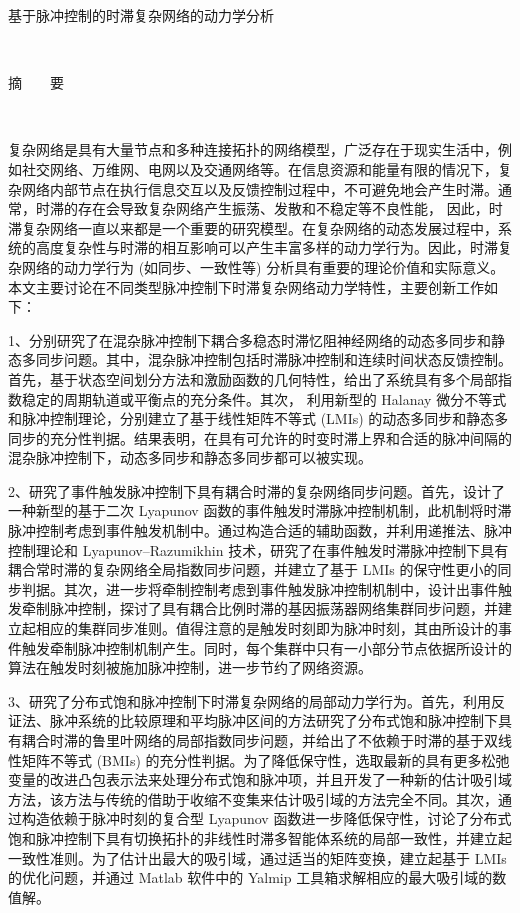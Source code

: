 \newpage
\setcounter{page}{1}

\pagestyle{plain}
\begin{center}
 {\heiti{} 基于脉冲控制的时滞复杂网络的动力学分析}
 \end{center}　

 \begin{center}
 {\heiti{}  摘~~~~要}
 \end{center}　

\renewcommand{\theequation}{\arabic{equation}}
\setcounter{equation}{0}

\vskip 4pt

复杂网络是具有大量节点和多种连接拓扑的网络模型，广泛存在于现实生活中，例如社交网络、万维网、电网以及交通网络等。在信息资源和能量有限的情况下，复杂网络内部节点在执行信息交互以及反馈控制过程中，不可避免地会产生时滞。通常，时滞的存在会导致复杂网络产生振荡、发散和不稳定等不良性能，
因此，时滞复杂网络一直以来都是一个重要的研究模型。在复杂网络的动态发展过程中，系统的高度复杂性与时滞的相互影响可以产生丰富多样的动力学行为。因此，时滞复杂网络的动力学行为 (如同步、一致性等) 分析具有重要的理论价值和实际意义。本文主要讨论在不同类型脉冲控制下时滞复杂网络动力学特性，主要创新工作如下：

\vskip 4pt
1、分别研究了在混杂脉冲控制下耦合多稳态时滞忆阻神经网络的动态多同步和静态多同步问题。其中，混杂脉冲控制包括时滞脉冲控制和连续时间状态反馈控制。首先，基于状态空间划分方法和激励函数的几何特性，给出了系统具有多个局部指数稳定的周期轨道或平衡点的充分条件。其次， 利用新型的 Halanay 微分不等式和脉冲控制理论，分别建立了基于线性矩阵不等式 (LMIs) 的动态多同步和静态多同步的充分性判据。结果表明，在具有可允许的时变时滞上界和合适的脉冲间隔的混杂脉冲控制下，动态多同步和静态多同步都可以被实现。 

\vskip 4pt
2、研究了事件触发脉冲控制下具有耦合时滞的复杂网络同步问题。首先，设计了一种新型的基于二次 Lyapunov 函数的事件触发时滞脉冲控制机制，此机制将时滞脉冲控制考虑到事件触发机制中。通过构造合适的辅助函数，并利用递推法、脉冲控制理论和 Lyapunov–Razumikhin 技术，研究了在事件触发时滞脉冲控制下具有耦合常时滞的复杂网络全局指数同步问题，并建立了基于 LMIs 的保守性更小的同步判据。其次，进一步将牵制控制考虑到事件触发脉冲控制机制中，设计出事件触发牵制脉冲控制，探讨了具有耦合比例时滞的基因振荡器网络集群同步问题，并建立起相应的集群同步准则。值得注意的是触发时刻即为脉冲时刻，其由所设计的事件触发牵制脉冲控制机制产生。同时，每个集群中只有一小部分节点依据所设计的算法在触发时刻被施加脉冲控制，进一步节约了网络资源。 


\vskip 4pt
3、研究了分布式饱和脉冲控制下时滞复杂网络的局部动力学行为。首先，利用反证法、脉冲系统的比较原理和平均脉冲区间的方法研究了分布式饱和脉冲控制下具有耦合时滞的鲁里叶网络的局部指数同步问题，并给出了不依赖于时滞的基于双线性矩阵不等式 (BMIs) 的充分性判据。为了降低保守性，选取最新的具有更多松弛变量的改进凸包表示法来处理分布式饱和脉冲项，并且开发了一种新的估计吸引域方法，该方法与传统的借助于收缩不变集来估计吸引域的方法完全不同。其次，通过构造依赖于脉冲时刻的复合型 Lyapunov 函数进一步降低保守性，讨论了分布式饱和脉冲控制下具有切换拓扑的非线性时滞多智能体系统的局部一致性，并建立起一致性准则。为了估计出最大的吸引域，通过适当的矩阵变换，建立起基于 LMIs 的优化问题，并通过 Matlab 软件中的 Yalmip 工具箱求解相应的最大吸引域的数值解。 

